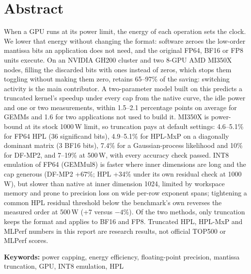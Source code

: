 \chapter*{Abstract}

{\linespread{1.3}\selectfont
When a GPU runs at its power limit, the energy of each operation sets the clock. We lower that energy without changing
the format: software zeroes the low-order mantissa bits an application does not need, and the original FP64, BF16 or FP8
units execute. On an NVIDIA GH200 cluster and two 8-GPU AMD MI350X nodes, filling the discarded bits with ones instead of
zeros, which stops them toggling without making them zero, retains 65--97\% of the saving: switching activity is the
main contributor. A two-parameter model built on this predicts a truncated kernel's speedup under every cap from the
native curve, the idle power and one or two measurements, within 1.5--2.1 percentage points on average for GEMMs and 1.6
for two applications not used to build it. MI350X is power-bound at its stock 1000\,W limit, so truncation pays at
default settings: 4.6--5.1\% for FP64 HPL (36 significand bits), 4.9--5.1\% for HPL-MxP on a diagonally dominant matrix
(3 BF16 bits), 7.4\% for a Gaussian-process likelihood and 10\% for DF-MP2, and 7--19\% at 500\,W, with every accuracy
check passed. INT8 emulation of FP64 (GEMMul8) is faster where inner dimensions are long and the cap generous (DF-MP2 +67\%;
HPL +34\% under its own residual check at 1000\,W), but slower than native at inner dimension 1024, limited by workspace
memory and prone to precision loss on wide per-row exponent spans; tightening a common HPL residual threshold below the
benchmark's own reverses the measured order at 500\,W (+7 versus $-4$\%). Of the two methods, only truncation keeps the format and
applies to BF16 and FP8. Truncated HPL, HPL-MxP and MLPerf numbers in this report are research
results, not official TOP500 or MLPerf scores.

\vspace{1em}
\noindent\textbf{Keywords:} power capping, energy efficiency, floating-point precision, mantissa truncation, GPU,
INT8 emulation, HPL
\par}
